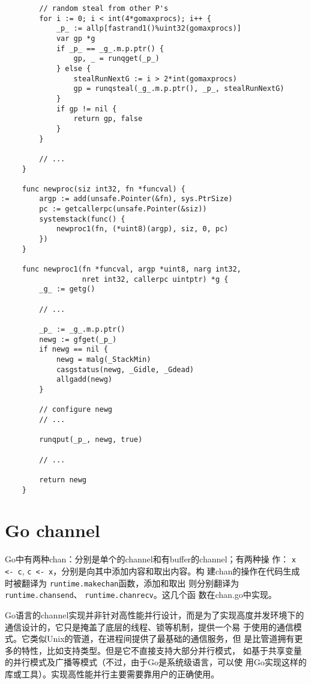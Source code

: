 \documentclass[UTF8,b5paper,fontset=adobe]{ctexart}
\begin{document}
\begin{verbatim}
        // random steal from other P's
        for i := 0; i < int(4*gomaxprocs); i++ {
            _p_ := allp[fastrand1()%uint32(gomaxprocs)]
            var gp *g
            if _p_ == _g_.m.p.ptr() {
                gp, _ = runqget(_p_)
            } else {
                stealRunNextG := i > 2*int(gomaxprocs)
                gp = runqsteal(_g_.m.p.ptr(), _p_, stealRunNextG)
            }
            if gp != nil {
                return gp, false
            }
        }

        // ...
    }

    func newproc(siz int32, fn *funcval) {
        argp := add(unsafe.Pointer(&fn), sys.PtrSize)
        pc := getcallerpc(unsafe.Pointer(&siz))
        systemstack(func() {
            newproc1(fn, (*uint8)(argp), siz, 0, pc)
        })
    }

    func newproc1(fn *funcval, argp *uint8, narg int32,
                  nret int32, callerpc uintptr) *g {
        _g_ := getg()

        // ...

        _p_ := _g_.m.p.ptr()
        newg := gfget(_p_)
        if newg == nil {
            newg = malg(_StackMin)
            casgstatus(newg, _Gidle, _Gdead)
            allgadd(newg)
        }

        // configure newg
        // ...

        runqput(_p_, newg, true)

        // ...

        return newg
    }
\end{verbatim}

\section{Go channel}

Go中有两种chan：分别是单个的channel和有buffer的channel；有两种操
作： \verb+x <- c+,  \verb+c <- x+，分别是向其中添加内容和取出内容。构
建chan的操作在代码生成时被翻译为 \verb+runtime.makechan+函数，添加和取出
则分别翻译为 \verb+runtime.chansend+、 \verb+runtime.chanrecv+。这几个函
数在chan.go中实现。

Go语言的channel实现并非针对高性能并行设计，而是为了实现高度并发环境下的
通信设计的\cite{pike2012}，它只是掩盖了底层的线程、锁等机制，提供一个易
于使用的通信模式。它类似Unix的管道，在进程间提供了最基础的通信服务，但
是比管道拥有更多的特性，比如支持类型。但是它不直接支持大部分并行模式，
如基于共享变量的并行模式及广播等模式（不过，由于Go是系统级语言，可以使
用Go实现这样的库或工具）。实现高性能并行主要需要靠用户的正确使用。
\end{document}
